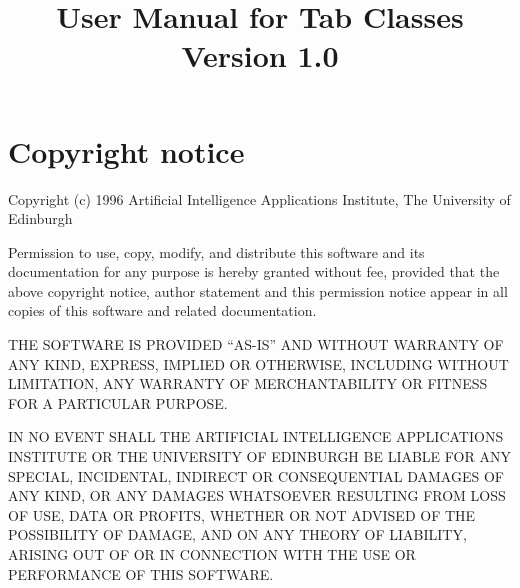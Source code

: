 \newcommand{\indexit}[1]{#1\index{#1}}%
\newcommand{\pipe}[0]{$\|$\ }%

\parskip=10pt
\parindent=0pt
\title{User Manual for Tab Classes Version 1.0}
\makeindex

\maketitle
\pagestyle{fancyplain}

\setfooter{\thepage}{}{}{}{}{\thepage}%
\tableofcontents

\chapter*{Copyright notice}
%
\setfooter{\thepage}{}{}{}{}{\thepage}%

\begin{center}
Copyright (c) 1996 Artificial Intelligence Applications Institute,
The University of Edinburgh\\
\end{center}

Permission to use, copy, modify, and distribute this software and its
documentation for any purpose is hereby granted without fee, provided that the
above copyright notice, author statement and this permission notice appear in
all copies of this software and related documentation.

THE SOFTWARE IS PROVIDED ``AS-IS'' AND WITHOUT WARRANTY OF ANY KIND, EXPRESS,
IMPLIED OR OTHERWISE, INCLUDING WITHOUT LIMITATION, ANY WARRANTY OF
MERCHANTABILITY OR FITNESS FOR A PARTICULAR PURPOSE.

IN NO EVENT SHALL THE ARTIFICIAL INTELLIGENCE APPLICATIONS INSTITUTE OR THE
UNIVERSITY OF EDINBURGH BE LIABLE FOR ANY SPECIAL, INCIDENTAL, INDIRECT OR
CONSEQUENTIAL DAMAGES OF ANY KIND, OR ANY DAMAGES WHATSOEVER RESULTING FROM
LOSS OF USE, DATA OR PROFITS, WHETHER OR NOT ADVISED OF THE POSSIBILITY OF
DAMAGE, AND ON ANY THEORY OF LIABILITY, ARISING OUT OF OR IN CONNECTION WITH
THE USE OR PERFORMANCE OF THIS SOFTWARE.





\newpage

%
\setfooter{\thepage}{}{}{}{}{\thepage}
\printindex

